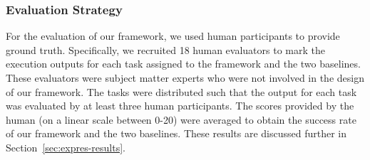 \subsubsection{Evaluation Strategy}
For the evaluation of our framework, we used human participants to provide ground truth. Specifically, we recruited 18 human evaluators to mark the execution outputs for each task assigned to the framework and the two baselines. These evaluators were subject matter experts who were not involved in the design of our framework. The tasks were distributed such that the output for each task was evaluated by at least three human participants. The scores provided by the human (on a linear scale between 0-20) were averaged to obtain the success rate of our framework and the two baselines. These results are discussed further in Section~\ref{sec:expres-results}.


